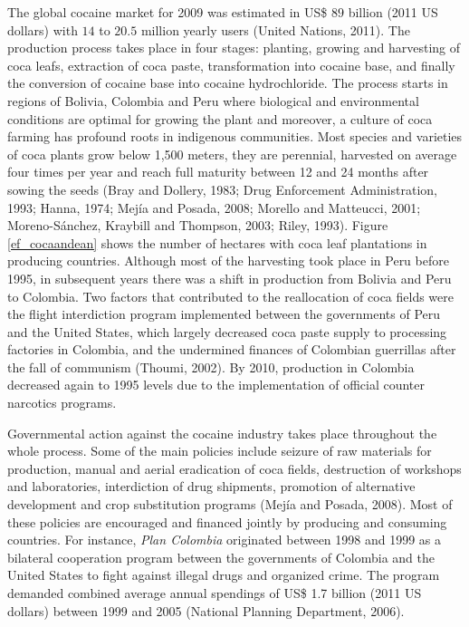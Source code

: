 \documentclass[12pt,a4paper,english]{article}%
\begin{document}
The global cocaine market for 2009 was estimated in US\$ $89$ billion (2011 US dollars) with $14$ to $20.5$ million yearly users (United Nations, 2011). The production process takes place in four stages: planting, growing and harvesting of coca leafs, extraction of coca paste, transformation into cocaine base, and finally the conversion of cocaine base into cocaine hydrochloride. The process starts in regions of Bolivia, Colombia and Peru where biological and environmental conditions are optimal for growing the plant and moreover, a culture of coca farming has profound roots in indigenous communities. Most species and varieties of coca plants grow below 1,500 meters, they are perennial, harvested on average four times per year and reach full maturity between 12 and 24 months after sowing the seeds (Bray and Dollery, 1983; Drug Enforcement Administration, 1993; Hanna, 1974; Mej\'{i}a and Posada, 2008; Morello and Matteucci, 2001; Moreno-S\'{a}nchez, Kraybill and Thompson, 2003; Riley, 1993). Figure \ref{ef_cocaandean} shows the number of hectares with coca leaf plantations in producing countries. Although most of the harvesting took place in Peru before 1995, in subsequent years there was a shift in production from Bolivia and Peru to Colombia. Two factors that contributed to the reallocation of coca fields were the flight interdiction program implemented between the governments of Peru and the United States, which largely decreased coca paste supply to processing factories in Colombia, and the undermined finances of Colombian guerrillas after the fall of communism (Thoumi, 2002). By 2010, production in Colombia decreased again to 1995 levels due to the implementation of official counter narcotics programs.

Governmental action against the cocaine industry takes place throughout the whole process. Some of the main policies include seizure of raw materials for production, manual and aerial eradication of coca fields, destruction of workshops and laboratories, interdiction of drug shipments, promotion of alternative development and crop substitution programs (Mej\'{i}a and Posada, 2008). Most of these policies are encouraged and financed jointly by producing and consuming countries. For instance, \emph{Plan Colombia} originated between 1998 and 1999 as a bilateral cooperation program between the governments of Colombia and the United States to fight against illegal drugs and organized crime. The program demanded combined average annual spendings of US\$ 1.7 billion (2011 US dollars) between 1999 and 2005 (National Planning Department, 2006). 
\end{document}
